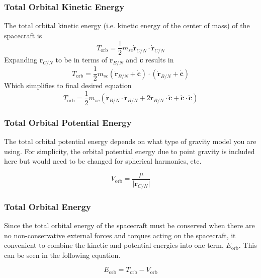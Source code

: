 \subsubsection{Total Orbital Kinetic Energy}

The total orbital kinetic energy (i.e. kinetic energy of the center of mass) of the spacecraft is
\begin{equation}
T_{\text{orb}} = \frac{1}{2} m_{sc} \dot{\bm r}_{C/N} \cdot \dot{\bm r}_{C/N}
\end{equation}
Expanding $\dot{\bm r}_{C/N}$ to be in terms of $\dot{\bm r}_{B/N}$ and $\dot{\bm c}$ results in
\begin{equation}
T_{\text{orb}} = \frac{1}{2} m_{sc} (\dot{\bm r}_{B/N} + \dot{\bm c}) \cdot (\dot{\bm r}_{B/N} + \dot{\bm c})
\end{equation}
Which simplifies to final desired equation
\begin{equation}
T_{\text{orb}} = \frac{1}{2} m_{sc} (\dot{\bm r}_{B/N}\cdot \dot{\bm r}_{B/N} + 2 \dot{\bm r}_{B/N} \cdot \dot{\bm c} + \dot{\bm c} \cdot \dot{\bm c})
\end{equation}

\subsubsection{Total Orbital Potential Energy}

The total orbital potential energy depends on what type of gravity model you are using. For simplicity, the orbital potential energy due to point gravity is included here but would need to be changed for spherical harmonics, etc. 

\begin{equation}
V_{\text{orb}} = \frac{\mu}{\vert \bm r_{C/N} \vert}
\end{equation}

\subsubsection{Total Orbital Energy}

Since the total orbital energy of the spacecraft must be conserved when there are no non-conservative external forces and torques acting on the spacecraft, it convenient to combine the kinetic and potential energies into one term, $E_{\text{orb}}$. This can be seen in the following equation.

\begin{equation}
E_{\text{orb}} = T_{\text{orb}} - V_{\text{orb}}
\end{equation}

